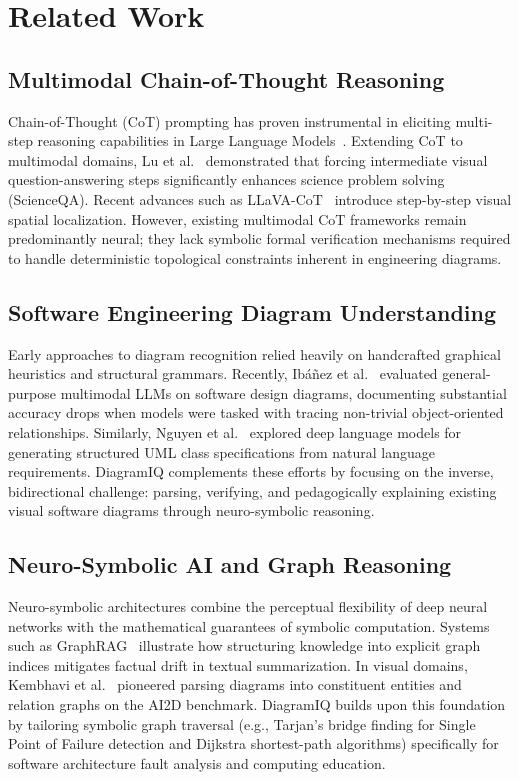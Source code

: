 \documentclass[runningheads]{llncs}
\begin{document}
\section{Related Work}
\label{sec:related}

\subsection{Multimodal Chain-of-Thought Reasoning}
Chain-of-Thought (CoT) prompting has proven instrumental in eliciting multi-step reasoning capabilities in Large Language Models~\cite{wei2022chain}. Extending CoT to multimodal domains, Lu et al.~\cite{lu2022learn} demonstrated that forcing intermediate visual question-answering steps significantly enhances science problem solving (ScienceQA). Recent advances such as LLaVA-CoT~\cite{xu2024llavacot} introduce step-by-step visual spatial localization. However, existing multimodal CoT frameworks remain predominantly neural; they lack symbolic formal verification mechanisms required to handle deterministic topological constraints inherent in engineering diagrams.

\subsection{Software Engineering Diagram Understanding}
Early approaches to diagram recognition relied heavily on handcrafted graphical heuristics and structural grammars. Recently, Ibáñez et al.~\cite{ibanez2025evaluating} evaluated general-purpose multimodal LLMs on software design diagrams, documenting substantial accuracy drops when models were tasked with tracing non-trivial object-oriented relationships. Similarly, Nguyen et al.~\cite{nguyen2025umlcode} explored deep language models for generating structured UML class specifications from natural language requirements. DiagramIQ complements these efforts by focusing on the inverse, bidirectional challenge: parsing, verifying, and pedagogically explaining existing visual software diagrams through neuro-symbolic reasoning.

\subsection{Neuro-Symbolic AI and Graph Reasoning}
Neuro-symbolic architectures combine the perceptual flexibility of deep neural networks with the mathematical guarantees of symbolic computation. Systems such as GraphRAG~\cite{edge2024graphrag} illustrate how structuring knowledge into explicit graph indices mitigates factual drift in textual summarization. In visual domains, Kembhavi et al.~\cite{kembhavi2016diagram} pioneered parsing diagrams into constituent entities and relation graphs on the AI2D benchmark. DiagramIQ builds upon this foundation by tailoring symbolic graph traversal (e.g., Tarjan's bridge finding for Single Point of Failure detection and Dijkstra shortest-path algorithms) specifically for software architecture fault analysis and computing education.
\end{document}
